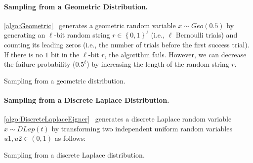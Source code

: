 \paragraph{Sampling from a Geometric Distribution.}
\autoref{algo:Geometric}~\cite{walker1974fast, googleDP2019} generates a geometric random variable $x\sim Geo\left(0.5\right) $ by generating an $\ell$-bit random string $r\in \left\{0,1\right\}^\ell $ (i.e., $\ell$ Bernoulli trials) and counting its leading zeros (i.e., the number of trials before the first success trial). If there is no $1$ bit in the $\ell$-bit $r$, the algorithm fails. However, we can decrease the failure probability ($0.5^{\ell}$) by increasing the length of the random string $r$.

\begin{algorithm}[tbh!]
    \centering
    \caption{Sampling from a geometric distribution.}
    \label{algo:Geometric}
\end{algorithm}
\FloatBarrier

\paragraph{Sampling from a Discrete Laplace Distribution.}
\autoref{algo:DiscreteLaplaceEigner}~\cite{eigner2014differentially} generates a discrete Laplace random variable $x\sim DLap\left(t\right) $ by transforming two independent uniform random variables $u1, u2 \in \left(0,1\right) $ as follows:

\begin{algorithm}[tbh!]
    \centering
    \caption{Sampling from a discrete Laplace distribution.}
    \label{algo:DiscreteLaplaceEigner}
\end{algorithm}
\FloatBarrier


